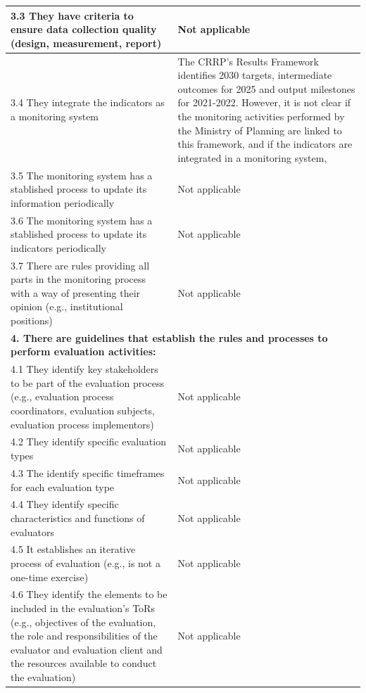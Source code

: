 \documentclass[
  10pt,
]{book}
\begin{document}
\begin{table}
\begin{tabular}[t]{l|l}
\hline
\hspace{1em}3.3 They have criteria to ensure data collection quality (design, measurement, report) & Not applicable\\
\hline
\hspace{1em}3.4 They integrate the indicators as a monitoring system & The CRRP’s Results Framework identifies 2030 targets, intermediate outcomes for 2025 and output milestones for 2021-2022. However, it is not clear if the monitoring activities performed by the Ministry of Planning are linked to this framework, and if the indicators are integrated in a monitoring system,\\
\hline
\hspace{1em}3.5 The monitoring system has a stablished process to update its information periodically & Not applicable\\
\hline
\hspace{1em}3.6 The monitoring system has a stablished process to update its indicators periodically & Not applicable\\
\hline
\hspace{1em}3.7 There are rules providing all parts in the monitoring process with a way of presenting their opinion (e.g., institutional positions) & Not applicable\\
\hline
\multicolumn{2}{l}{\textbf{4. There are guidelines that establish the rules and processes to perform evaluation activities:}}\\
\hline
\hspace{1em}4.1 They identify key stakeholders to be part of the evaluation process (e.g., evaluation process coordinators, evaluation subjects, evaluation process implementors) & Not applicable\\
\hline
\hspace{1em}4.2 They identify specific evaluation types & Not applicable\\
\hline
\hspace{1em}4.3 The identify specific timeframes for each evaluation type & Not applicable\\
\hline
\hspace{1em}4.4 They identify specific characteristics and functions of evaluators & Not applicable\\
\hline
\hspace{1em}4.5 It establishes an iterative process of evaluation (e.g.,  is not a one-time exercise) & Not applicable\\
\hline
\hspace{1em}4.6 They identify the elements to be included in the evaluation's ToRs (e.g., objectives of the evaluation, the role and responsibilities of the evaluator and evaluation client and the resources available to conduct the evaluation) & Not applicable\\

\end{tabular}
\end{table}
\end{document}
